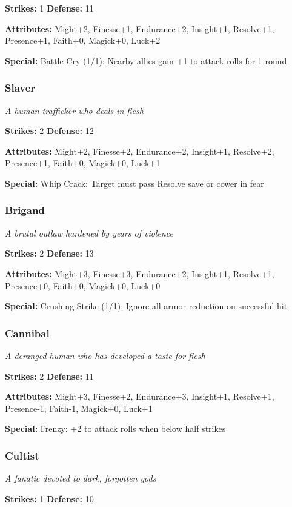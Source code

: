 \documentclass[10pt,twoside]{article}
\begin{document}
\textbf{Strikes:} 1 \quad \textbf{Defense:} 11

\textbf{Attributes:} Might+2, Finesse+1, Endurance+2, Insight+1, Resolve+1, Presence+1, Faith+0, Magick+0, Luck+2

\textbf{Special:} Battle Cry (1/1): Nearby allies gain +1 to attack rolls for 1 round

\subsubsection{Slaver}
\textit{A human trafficker who deals in flesh}

\textbf{Strikes:} 2 \quad \textbf{Defense:} 12

\textbf{Attributes:} Might+2, Finesse+2, Endurance+2, Insight+1, Resolve+2, Presence+1, Faith+0, Magick+0, Luck+1

\textbf{Special:} Whip Crack: Target must pass Resolve save or cower in fear

\subsubsection{Brigand}
\textit{A brutal outlaw hardened by years of violence}

\textbf{Strikes:} 2 \quad \textbf{Defense:} 13

\textbf{Attributes:} Might+3, Finesse+3, Endurance+2, Insight+1, Resolve+1, Presence+0, Faith+0, Magick+0, Luck+0

\textbf{Special:} Crushing Strike (1/1): Ignore all armor reduction on successful hit

\subsubsection{Cannibal}
\textit{A deranged human who has developed a taste for flesh}

\textbf{Strikes:} 2 \quad \textbf{Defense:} 11

\textbf{Attributes:} Might+3, Finesse+2, Endurance+3, Insight+1, Resolve+1, Presence-1, Faith-1, Magick+0, Luck+1

\textbf{Special:} Frenzy: +2 to attack rolls when below half strikes

\subsubsection{Cultist}
\textit{A fanatic devoted to dark, forgotten gods}

\textbf{Strikes:} 1 \quad \textbf{Defense:} 10
\end{document}
